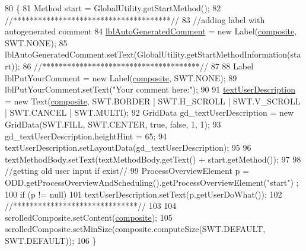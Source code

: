 \begin{DoxyCode}
80                                   \{
81         Method start = GlobalUtility.getStartMethod();
82         \textcolor{comment}{//**************************************//}
83         \textcolor{comment}{//adding label with autogenerated comment}
84         \hyperlink{classit_1_1isislab_1_1masonhelperdocumentation_1_1mason_1_1wizards_1_1_i___start_information_page_a71b48bb46faed54b4236b3d52a074580}{lblAutoGeneratedComment} = \textcolor{keyword}{new} Label(\hyperlink{classit_1_1isislab_1_1masonhelperdocumentation_1_1mason_1_1wizards_1_1_i___start_information_page_a4ab7b99c568dbe299dfcd34acb6ad97c}{composite}, SWT.NONE);
85         lblAutoGeneratedComment.setText(GlobalUtility.getStartMethodInformation(start));
86         \textcolor{comment}{//**************************************//}
87         
88         Label lblPutYourComment = \textcolor{keyword}{new} Label(\hyperlink{classit_1_1isislab_1_1masonhelperdocumentation_1_1mason_1_1wizards_1_1_i___start_information_page_a4ab7b99c568dbe299dfcd34acb6ad97c}{composite}, SWT.NONE);
89         lblPutYourComment.setText(\textcolor{stringliteral}{"Your comment here:"});
90         
91         \hyperlink{classit_1_1isislab_1_1masonhelperdocumentation_1_1mason_1_1wizards_1_1_i___start_information_page_a5b9b23fd18d352b235614b6bdfd23477}{textUserDescription} = \textcolor{keyword}{new} Text(\hyperlink{classit_1_1isislab_1_1masonhelperdocumentation_1_1mason_1_1wizards_1_1_i___start_information_page_a4ab7b99c568dbe299dfcd34acb6ad97c}{composite}, SWT.BORDER | SWT.H\_SCROLL | 
      SWT.V\_SCROLL | SWT.CANCEL | SWT.MULTI);
92         GridData gd\_textUserDescription = \textcolor{keyword}{new} GridData(SWT.FILL, SWT.CENTER, \textcolor{keyword}{true}, \textcolor{keyword}{false}, 1, 1);
93         gd\_textUserDescription.heightHint = 65;
94         textUserDescription.setLayoutData(gd\_textUserDescription);
95         
96         textMethodBody.setText(textMethodBody.getText() +  start.getMethod());
97 
98         \textcolor{comment}{//getting old user input if exist//}
99         ProcessOverviewElement p = ODD.getProcessOverviewAndScheduling().getProcessOverviewElement(\textcolor{stringliteral}{"start"})
      ;
100         \textcolor{keywordflow}{if} (p != null)
101             textUserDescription.setText(p.getUserDoWhat());
102         \textcolor{comment}{//******************************//}
103         
104         scrolledComposite.setContent(\hyperlink{classit_1_1isislab_1_1masonhelperdocumentation_1_1mason_1_1wizards_1_1_i___start_information_page_a4ab7b99c568dbe299dfcd34acb6ad97c}{composite});
105         scrolledComposite.setMinSize(composite.computeSize(SWT.DEFAULT, SWT.DEFAULT));
106     \}
\end{DoxyCode}


